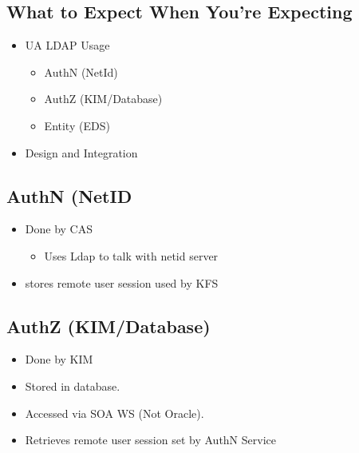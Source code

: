 \documentclass[12pt,notitlepage]{article}
\author{Leo Przybylski}
\begin{document}
  \W \begin{s5presentation}
  \maketitle
  \W \begin{s5slide}
    \W \section{What to Expect When You're Expecting}
    \begin{itemize}
      \item UA LDAP Usage
        \begin{itemize}
          \item  AuthN (NetId)
          \item AuthZ (KIM/Database)
          \item Entity (EDS)
        \end{itemize}
        \item Design and Integration
    \end{itemize}
    \W \begin{s5notes}
    \W \end{s5notes}
    \W \end {s5slide}

  \W \begin{s5slide}
    \W \section{AuthN (NetID}
    \begin{itemize}
      \item Done by CAS
        \begin{itemize}
          \item Uses Ldap to talk with netid server
        \end{itemize}
        \item stores remote user session used by KFS
    \end{itemize}
    \W \begin{s5notes}
    \W \end{s5notes}
    \W \end {s5slide}

  \W \begin{s5slide}
    \W \section{AuthZ (KIM/Database)}
    \begin{itemize}
      \item Done by KIM
        \item Stored in database.
        \item Accessed via SOA WS (Not Oracle).
        \item Retrieves remote user session set by AuthN Service
    \end{itemize}
    \W \begin{s5notes}
    \W \end{s5notes}
    \W \end {s5slide}


\end{s5presentation}
\end{document}
